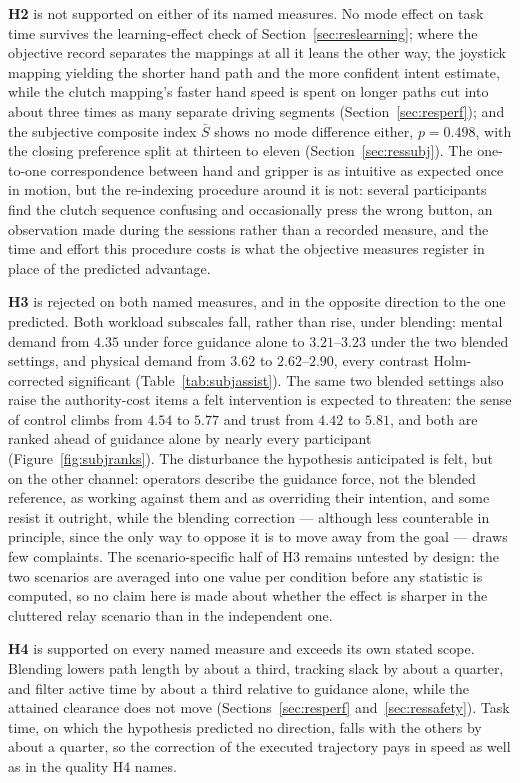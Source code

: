 \textbf{H2} is not supported on either of its named measures. No mode effect on task time survives the learning-effect check of Section~\ref{sec:reslearning}; where the objective record separates the mappings at all it leans the other way, the joystick mapping yielding the shorter hand path and the more confident intent estimate, while the clutch mapping's faster hand speed is spent on longer paths cut into about three times as many separate driving segments (Section~\ref{sec:resperf}); and the subjective composite index $\bar{S}$ shows no mode difference either, $p=0.498$, with the closing preference split at thirteen to eleven (Section~\ref{sec:ressubj}). The one-to-one correspondence between hand and gripper is as intuitive as expected once in motion, but the re-indexing procedure around it is not: several participants find the clutch sequence confusing and occasionally press the wrong button, an observation made during the sessions rather than a recorded measure, and the time and effort this procedure costs is what the objective measures register in place of the predicted advantage.

\textbf{H3} is rejected on both named measures, and in the opposite direction to the one predicted. Both workload subscales fall, rather than rise, under blending: mental demand from $4.35$ under force guidance alone to $3.21$--$3.23$ under the two blended settings, and physical demand from $3.62$ to $2.62$--$2.90$, every contrast Holm-corrected significant (Table~\ref{tab:subjassist}). The same two blended settings also raise the authority-cost items a felt intervention is expected to threaten: the sense of control climbs from $4.54$ to $5.77$ and trust from $4.42$ to $5.81$, and both are ranked ahead of guidance alone by nearly every participant (Figure~\ref{fig:subjranks}). The disturbance the hypothesis anticipated is felt, but on the other channel: operators describe the guidance force, not the blended reference, as working against them and as overriding their intention, and some resist it outright, while the blending correction --- although less counterable in principle, since the only way to oppose it is to move away from the goal --- draws few complaints. The scenario-specific half of H3 remains untested by design: the two scenarios are averaged into one value per condition before any statistic is computed, so no claim here is made about whether the effect is sharper in the cluttered relay scenario than in the independent one.

\textbf{H4} is supported on every named measure and exceeds its own stated scope. Blending lowers path length by about a third, tracking slack by about a quarter, and filter active time by about a third relative to guidance alone, while the attained clearance does not move (Sections~\ref{sec:resperf} and~\ref{sec:ressafety}). Task time, on which the hypothesis predicted no direction, falls with the others by about a quarter, so the correction of the executed trajectory pays in speed as well as in the quality H4 names.

